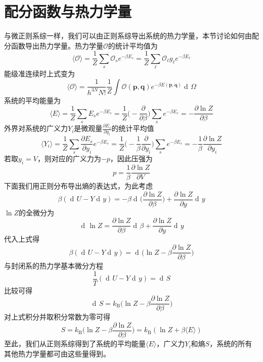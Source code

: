 \documentclass[UTF8,oneside,openany]{ctexbook}
\DeclareMathOperator\dif{d\!}
\newcommand\aver[1]{\langle#1\rangle}
\newcommand\kb{k_{\text{B}}}
\begin{document}
\section{配分函数与热力学量}
与微正则系综一样，我们可以由正则系综导出系统的热力学量，本节讨论如何由配分函数导出热力学量。热力学量$\mathcal{O}$的统计平均值为
\begin{equation}
\aver{\mathcal{O}}=\frac1Z\sum_{s}\mathcal{O}_se^{-\beta E_s}=\frac1Z\sum_{\ell}\mathcal{O}_{\ell}g_{\ell}e^{-\beta E_{\ell}}
\end{equation}
能级准连续时上式变为
\begin{equation}
\aver{\mathcal{O}}=\frac{1}{h^{3N}N!}\frac1Z\int\mathcal{O}(\pmb{p},\pmb{q})e^{-\beta E(\pmb{p},\pmb{q})}\dif\Omega
\end{equation}
系统的平均能量为
\begin{equation}\label{ae}
\aver{E}=\frac1Z\sum_{s}E_se^{-\beta E_s}=\frac1Z\biggl(-\frac{\partial}{\partial\beta}\biggr)\sum_{s}e^{-\beta E_s}=-\frac{\partial\ln Z}{\partial\beta}
\end{equation}
外界对系统的广义力$Y_i$是微观量$\frac{\partial E_s}{\partial y_i}$的统计平均值
\begin{equation}
\aver{Y_i}=\frac1Z\sum_{s}\frac{\partial E_s}{\partial y_i}e^{-\beta E_s}=\frac1Z\biggl(-\frac{1}{\beta}\frac{\partial}{\partial y_i}\biggr)\sum_{s}e^{-\beta E_s}=-\frac{1}{\beta}\frac{\partial\ln Z}{\partial y_i}
\end{equation}
若取$y_i=V$，则对应的广义力为$-p$，因此压强为
\begin{equation}\label{yq}
p=\frac{1}{\beta}\frac{\partial\ln Z}{\partial V}
\end{equation}
下面我们用正则分布导出熵的表达式，为此考虑
\begin{equation}
\beta(\dif U-Y\dif y)=-\beta\dif\biggl(\frac{\partial\ln Z}{\partial\beta}\biggr)+\frac{\partial\ln Z}{\partial y}\dif y
\end{equation}
$\ln Z$的全微分为
\begin{equation}
\dif\ln Z=\frac{\partial\ln Z}{\partial\beta}\dif\beta+\frac{\partial\ln Z}{\partial y}\dif y
\end{equation}
代入上式得
\begin{equation}
\beta(\dif U-Y\dif y)=\dif\biggl(\ln Z-\beta\frac{\partial\ln Z}{\partial\beta}\biggr)
\end{equation}
与封闭系的热力学基本微分方程
\begin{equation}
\frac1T(\dif U-Y\dif y)=\dif S
\end{equation}
比较可得
\begin{equation}
\dif S=\kb\biggl(\ln Z-\beta\frac{\partial\ln Z}{\partial\beta}\biggr)
\end{equation}
对上式积分并取积分常数为零可得
\begin{equation}\label{S}
S=\kb\biggl(\ln Z-\beta\frac{\partial\ln Z}{\partial\beta}\biggr)=\kb(\ln Z+\beta\aver{E})
\end{equation}
至此，我们从正则系综得到了系统的平均能量$\aver{E}$，广义力$Y_i$和熵$S$，系统的所有其他热力学量都可由这些量得到。
\end{document}
